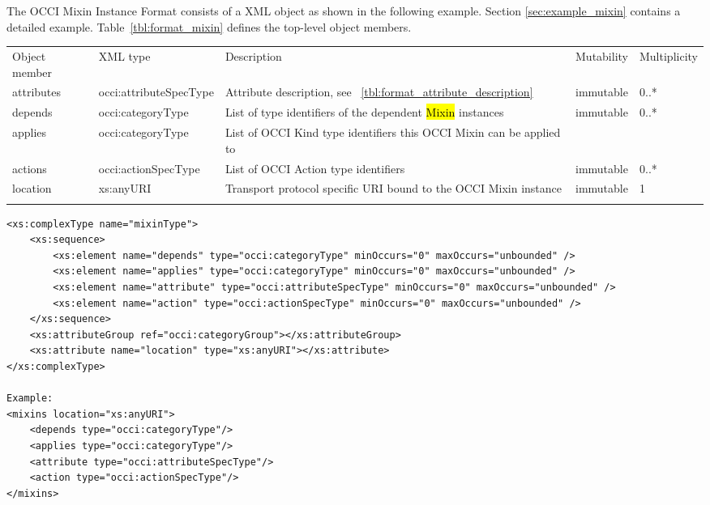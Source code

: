 \documentclass[10pt,a4paper]{article}
\begin{document}
The OCCI Mixin Instance Format consists of a XML object as shown in the following example. Section \ref{sec:example_mixin} contains a detailed example.
Table~\ref{tbl:format_mixin} defines the top-level object members.
 {
    \begin{tabularx}{\textwidth}{llXll}
    \toprule
    Object member & XML type & Description & Mutability & Multiplicity \\
    \colrule
    attributes & occi:attributeSpecType & Attribute description, see
~\ref{tbl:format_attribute_description} & immutable & 0..* \\

    depends & occi:categoryType & List of type identifiers of the dependent
 \hl{Mixin} instances & immutable & 0..* \\
 
    applies & occi:categoryType & List of OCCI Kind type identifiers this OCCI 
Mixin can be applied to \\

    actions & occi:actionSpecType & List of OCCI Action type identifiers
& immutable & 0..* \\

    location & xs:anyURI & Transport protocol specific URI bound to the OCCI Mixin
instance & immutable & 1 \\
    \botrule
    \end{tabularx}
}

\begin{lstlisting}
<xs:complexType name="mixinType">
	<xs:sequence>
		<xs:element name="depends" type="occi:categoryType" minOccurs="0" maxOccurs="unbounded" />
		<xs:element name="applies" type="occi:categoryType" minOccurs="0" maxOccurs="unbounded" />
		<xs:element name="attribute" type="occi:attributeSpecType" minOccurs="0" maxOccurs="unbounded" />
		<xs:element name="action" type="occi:actionSpecType" minOccurs="0" maxOccurs="unbounded" />
	</xs:sequence>
	<xs:attributeGroup ref="occi:categoryGroup"></xs:attributeGroup>
	<xs:attribute name="location" type="xs:anyURI"></xs:attribute>
</xs:complexType>

Example:
<mixins location="xs:anyURI">
	<depends type="occi:categoryType"/>
	<applies type="occi:categoryType"/>
	<attribute type="occi:attributeSpecType"/>
	<action type="occi:actionSpecType"/>
</mixins>
\end{lstlisting}
\end{document}
